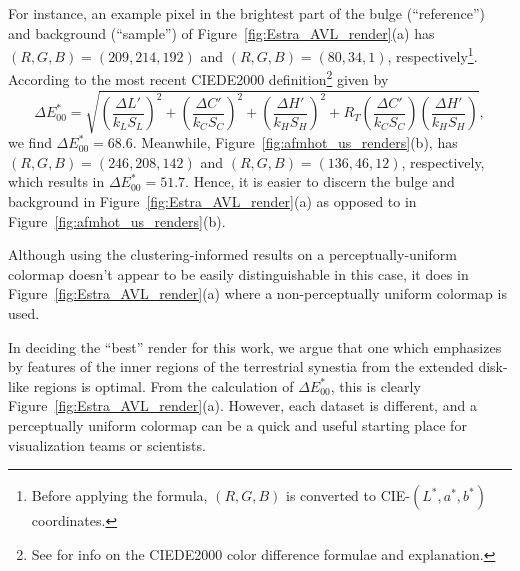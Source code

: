 \documentclass[fleqn,usenatbib,useAMS]{mnras}
\begin{document}
For instance, an example pixel in the brightest part of the bulge (``reference'') and background (``sample'') of Figure~\ref{fig:Estra_AVL_render}(a) has $(R,G,B)=(209,214,192)$ and $(R,G,B)=(80,34,1)$, respectively\footnote{Before applying the formula, $(R,G,B)$ is converted to CIE-$(L^*, a^*, b^*)$ coordinates.}. According to the most recent CIEDE2000 definition\footnote{See \cite{Sharma04} for info on the CIEDE2000 color difference formulae and explanation.} given by
%
\begin{equation}
    {\Delta E^*_{00} = \sqrt{ \left(\frac{\Delta L'}{k_L S_L}\right)^2 + \left(\frac{\Delta C'}{k_C S_C}\right)^2 + \left(\frac{\Delta H'}{k_H S_H}\right)^2 + R_T \left(\frac{\Delta C'}{k_C S_C}\right) \left(\frac{\Delta H'}{k_H S_H}\right)}},
\end{equation}
%
we find $\Delta E^*_{00}=68.6$.
Meanwhile, Figure~\ref{fig:afmhot_us_renders}(b), has $(R,G,B)=(246,208,142)$ and $(R,G,B)=(136,46,12)$, respectively, which results in $\Delta E^*_{00}=51.7$. Hence, it is easier to discern the bulge and background in Figure~\ref{fig:Estra_AVL_render}(a) as opposed to in Figure~\ref{fig:afmhot_us_renders}(b). \par

Although using the clustering-informed results on a perceptually-uniform colormap doesn't appear to be easily distinguishable in this case, it does in Figure~\ref{fig:Estra_AVL_render}(a) where a non-perceptually uniform colormap is used.

In deciding the ``best'' render for this work, we argue that one which emphasizes by features of the inner regions of the terrestrial synestia from the extended disk-like regions is optimal. From the calculation of $\Delta E^*_{00}$, this is clearly Figure~\ref{fig:Estra_AVL_render}(a). However, each dataset is different, and a perceptually uniform colormap can be a quick and useful starting place for visualization teams or scientists. \par 




\bsp	%
\label{lastpage}
\end{document}
